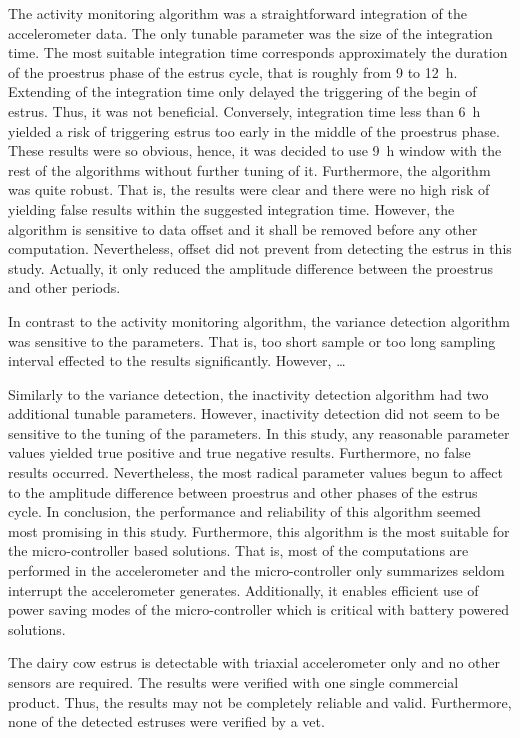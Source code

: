 \documentclass[english,12pt,a4paper,pdftex,elec,utf8]{aaltothesis}
\begin{document}
The activity monitoring algorithm was a straightforward integration of the accelerometer data. The only tunable parameter was the size of the integration time. The most suitable integration time corresponds approximately the duration of the proestrus phase of the estrus cycle, that is roughly from 9 to \SI{12}{\hour}. Extending of the integration time only delayed the triggering of the begin of estrus. Thus, it was not beneficial. Conversely, integration time less than \SI{6}{\hour} yielded a risk of triggering estrus too early in the middle of the proestrus phase. These results were so obvious, hence, it was decided to use \SI{9}{\hour} window with the rest of the algorithms without further tuning of it. Furthermore, the algorithm was quite robust. That is, the results were clear and there were no high risk of yielding false results within the suggested integration time. However, the algorithm is sensitive to data offset and it shall be removed before any other computation. Nevertheless, offset did not prevent from detecting the estrus in this study. Actually, it only reduced the amplitude difference between the proestrus and other periods.

In contrast to the activity monitoring algorithm, the variance detection algorithm was sensitive to the parameters. That is, too short sample or too long sampling interval effected to the results significantly. However, \dots

Similarly to the variance detection, the inactivity detection algorithm had two additional tunable parameters. However, inactivity detection did not seem to be sensitive to the tuning of the parameters. In this study, any reasonable parameter values yielded true positive and true negative results. Furthermore, no false results occurred. Nevertheless,  the most radical parameter values begun to affect to the amplitude difference between proestrus and other phases of the estrus cycle. In conclusion, the performance and reliability of this algorithm seemed most promising in this study. Furthermore, this algorithm is the most suitable for the micro-controller based solutions. That is, most of the computations are performed in the accelerometer and the micro-controller only summarizes seldom interrupt the accelerometer generates. Additionally, it enables efficient use of power saving modes of the micro-controller which is critical with battery powered solutions. 


The dairy cow estrus is detectable with triaxial accelerometer only and no other sensors are required. The results were verified with one single commercial product. Thus, the results may not be completely reliable and valid. Furthermore, none of the detected estruses were verified by a vet.
\end{document}
